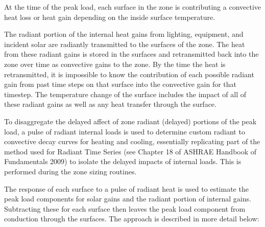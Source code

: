 At the time of the peak load, each surface in the zone is contributing a convective heat loss or heat gain depending on the inside surface temperature.

The radiant portion of the internal heat gains from lighting, equipment, and incident solar are radiantly transmitted to the surfaces of the zone. The heat from these radiant gains is stored in the surfaces and retransmitted back into the zone over time as convective gains to the zone. By the time the heat is retransmitted, it is impossible to know the contribution of each possible radiant gain from past time steps on that surface into the convective gain for that timestep. The temperature change of the surface includes the impact of all of these radiant gains as well as any heat transfer through the surface.

To disaggregate the delayed affect of zone radiant (delayed) portions of the peak load, a pulse of radiant internal loads is used to determine custom radiant to convective decay curves for heating and cooling, essentially replicating part of the method used for Radiant Time Series (see Chapter 18 of ASHRAE Handbook of Fundamentals 2009) to isolate the delayed impacts of internal loads. This is performed during the zone sizing routines.

The response of each surface to a pulse of radiant heat is used to estimate the peak load components for solar gains and the radiant portion of internal gains. Subtracting these for each surface then leaves the peak load component from conduction through the surfaces. The approach is described in more detail below:

